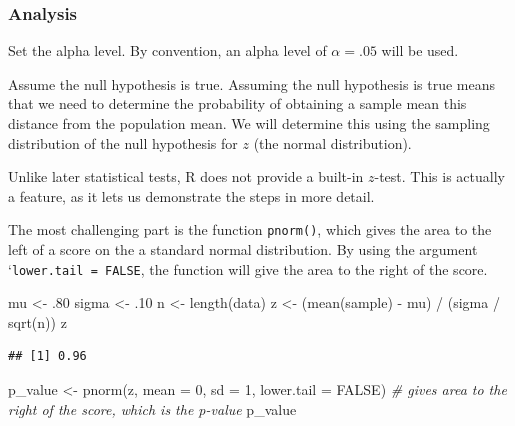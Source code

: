 \documentclass[
]{book}
\newenvironment{Shaded}{\begin{snugshade}}{\end{snugshade}}
\newcommand{\AttributeTok}[1]{\textcolor[rgb]{0.77,0.63,0.00}{#1}}
\newcommand{\CommentTok}[1]{\textcolor[rgb]{0.56,0.35,0.01}{\textit{#1}}}
\newcommand{\ConstantTok}[1]{\textcolor[rgb]{0.00,0.00,0.00}{#1}}
\newcommand{\DecValTok}[1]{\textcolor[rgb]{0.00,0.00,0.81}{#1}}
\newcommand{\FunctionTok}[1]{\textcolor[rgb]{0.00,0.00,0.00}{#1}}
\newcommand{\NormalTok}[1]{#1}
\newcommand{\OtherTok}[1]{\textcolor[rgb]{0.56,0.35,0.01}{#1}}
\newcommand{\SpecialCharTok}[1]{\textcolor[rgb]{0.00,0.00,0.00}{#1}}
\begin{document}
\hypertarget{analysis}{%
\subsubsection{Analysis}\label{analysis}}

Set the alpha level. By convention, an alpha level of \(\alpha = .05\) will be used.

Assume the null hypothesis is true. Assuming the null hypothesis is true means that we need to determine the probability of obtaining a sample mean this distance from the population mean. We will determine this using the sampling distribution of the null hypothesis for \(z\) (the normal distribution).

Unlike later statistical tests, R does not provide a built-in \(z\)-test. This is actually a feature, as it lets us demonstrate the steps in more detail.

The most challenging part is the function \texttt{pnorm()}, which gives the area to the left of a score on the a standard normal distribution. By using the argument `\texttt{lower.tail\ =\ FALSE}, the function will give the area to the right of the score.

\begin{Shaded}
\begin{Highlighting}[]
\NormalTok{mu }\OtherTok{\textless{}{-}}\NormalTok{ .}\DecValTok{80}
\NormalTok{sigma }\OtherTok{\textless{}{-}}\NormalTok{ .}\DecValTok{10}
\NormalTok{n }\OtherTok{\textless{}{-}} \FunctionTok{length}\NormalTok{(data)}
\NormalTok{z }\OtherTok{\textless{}{-}}\NormalTok{ (}\FunctionTok{mean}\NormalTok{(sample) }\SpecialCharTok{{-}}\NormalTok{ mu) }\SpecialCharTok{/}\NormalTok{ (sigma }\SpecialCharTok{/} \FunctionTok{sqrt}\NormalTok{(n))}
\NormalTok{z}
\end{Highlighting}
\end{Shaded}

\begin{verbatim}
## [1] 0.96
\end{verbatim}

\begin{Shaded}
\begin{Highlighting}[]
\NormalTok{p\_value }\OtherTok{\textless{}{-}} \FunctionTok{pnorm}\NormalTok{(z, }\AttributeTok{mean =} \DecValTok{0}\NormalTok{, }\AttributeTok{sd =} \DecValTok{1}\NormalTok{, }\AttributeTok{lower.tail =} \ConstantTok{FALSE}\NormalTok{) }\CommentTok{\# gives area to the right of the score, which is the p{-}value}
\NormalTok{p\_value}
\end{Highlighting}
\end{Shaded}
\end{document}
